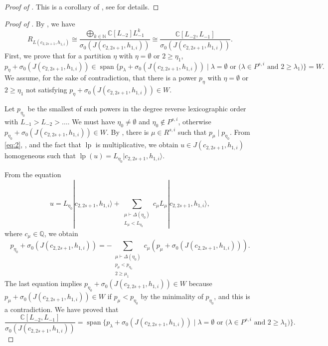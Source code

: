 \documentclass[a4paper, 12pt, reqno]{amsart}
\theoremstyle{remark}
\DeclareMathOperator{\vspan}{span}
\DeclareMathOperator{\lp}{lp}
\begin{document}
\begin{proof}[Proof of ]
  This is a corollary of , see \cite{salazar_pbw_2024} for details.
\end{proof}

\begin{proof}[Proof of ]
  By , we have
  \begin{equation*}
    R_{L(c_{2, 2s + 1}, h_{1, i})} \cong \frac{\bigoplus_{k \in \mathbb{N}}\mathbb{C}[L_{-2}]L_{-1}^k}{\sigma_0(J(c_{2, 2s + 1}, h_{1, i}))} \cong \frac{\mathbb{C}[L_{-2}, L_{-1}]}{\sigma_0(J(c_{2, 2s + 1}, h_{1, i}))}.
  \end{equation*}
  First, we prove that for a partition $\eta$ with $\eta = \emptyset$ or $2 \ge \eta_1$,
  \begin{equation*}
    p_{\eta} + \sigma_0(J(c_{2, 2s + 1}, h_{1, i})) \in \vspan\{p_{\lambda} + \sigma_0(J(c_{2, 2s + 1}, h_{1, i})) \mid \text{$\lambda = \emptyset$ or ($\lambda \in P^{s, i}$ and $2 \ge \lambda_1$)}\} = W.
  \end{equation*}
  We assume, for the sake of contradiction, that there is a power $p_{\eta}$ with $\eta = \emptyset$ or $2 \ge \eta_1$ not satisfying $p_{\eta} + \sigma_0(J(c_{2, 2s + 1}, h_{1, i})) \in W$.

  Let $p_{\eta_0}$ be the smallest of such powers in the degree reverse lexicographic order with $L_{-1} > L_{-2} > \dots$.
  We must have $\eta_0 \neq \emptyset$ and $\eta_0 \notin P^{s, i}$, otherwise $p_{\eta_0} + \sigma_0(J(c_{2, 2s + 1}, h_{1, i})) \in W$.
  By , there is $\mu \in R^{s, i}$ such that $p_{\mu} \mid p_{\eta_0}$.
  From \eqref{eq:2}, ,  and the fact that $\lp$ is multiplicative, we obtain $u \in J(c_{2, 2s + 1}, h_{1, i})$ homogeneous such that $\lp(u) = L_{\eta_0}|c_{2, 2s + 1}, h_{1, i}\rangle$.

  From the equation
  \begin{equation*}
    u = L_{\eta_0}|c_{2, 2s + 1}, h_{1, i}\rangle + \sum_{\substack{\mu \vdash \Delta(\eta_0) \\ L_{\mu} < L_{\eta_0}}}c_{\mu}L_{\mu}|c_{2, 2s + 1}, h_{1, i}\rangle,
  \end{equation*}
  where $c_{\mu} \in \mathbb{Q}$, we obtain
  \begin{equation*}
    p_{\eta_0} + \sigma_0(J(c_{2, 2s + 1}, h_{1, i}))= -\sum_{\substack{\mu \vdash \Delta(\eta_0) \\ p_{\mu} < p_{\eta_0} \\ 2 \ge \mu_1}}c_{\mu}(p_{\mu} + \sigma_0(J(c_{2, 2s + 1}, h_{1, i}))).
  \end{equation*}
  The last equation implies $p_{\eta_0} + \sigma_0(J(c_{2, 2s + 1}, h_{1, i})) \in W$ because $p_{\mu} + \sigma_0(J(c_{2, 2s + 1}, h_{1, i})) \in W$ if $p_{\mu} < p_{\eta_0}$ by the minimality of $p_{\eta_0}$, and this is a contradiction.
  We have proved that
  \begin{equation}
    \label{eq:8}
    \frac{\mathbb{C}[L_{-2}, L_{-1}]}{\sigma_0(J(c_{2, 2s + 1}, h_{1, i}))} = \vspan\{p_{\lambda} + \sigma_0(J(c_{2, 2s + 1}, h_{1, i})) \mid \text{$\lambda = \emptyset$ or ($\lambda \in P^{s, i}$ and $2 \ge \lambda_1$)}\}.
  \end{equation}


\end{proof}
\end{document}

